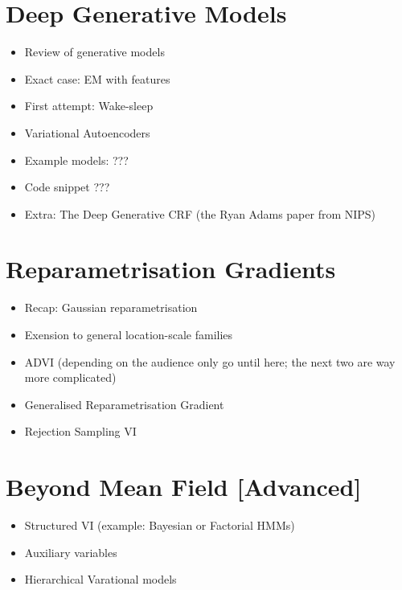 \documentclass[11pt, a4paper]{article}
\begin{document}
\section{Deep Generative Models}
\begin{itemize}
\item Review of generative models
\item Exact case: EM with features \citep{BergkirkpatrickEtAl:2010}
\item First attempt: Wake-sleep \citep{HintonEtAl:1995}
\item Variational Autoencoders \citep{KingmaWelling:2013, RezendeEtAl:2014}
\item Example models: ???
\item Code snippet ??? %
\item Extra: The Deep Generative CRF (the Ryan Adams paper from NIPS)
\end{itemize}

\section{Reparametrisation Gradients}


\begin{itemize}
\item Recap: Gaussian reparametrisation 
\item Exension to general location-scale families \citep{TitsiasLazarogredilla:2014}
\item ADVI (depending on the audience only go until here; the next two are way more complicated) \citep{KucukelbirEtAl:2017}
\item Generalised Reparametrisation Gradient \citep{RuizEtAl:2016}
\item Rejection Sampling VI \citep{NaessethEtAl:2017}
\end{itemize}

\section{Beyond Mean Field [Advanced]}
\begin{itemize}
\item Structured VI (example: Bayesian or Factorial HMMs)
\item Auxiliary variables
\item Hierarchical Varational models 
\end{itemize}
\end{document}
